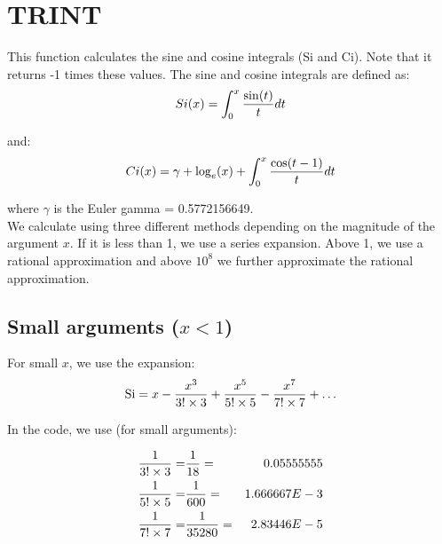 \section{TRINT}
\label{sect:trint}

\noindent This function calculates the sine and cosine integrals (Si and
Ci). Note that it returns -1 times these values. The sine and cosine
integrals are defined as:\\

\begin{equation}
Si(x) = \int_0^x {\sin(t) \over t} dt
\end{equation}

\noindent and:\\

\begin{equation}
Ci(x) = \gamma + \log_e(x) + \int_0^x {\cos(t-1) \over t} dt
\end{equation}

\noindent where $\gamma$ is the Euler gamma = 0.5772156649.\\

\noindent We calculate using three different methods depending on the
magnitude of the argument $x$. If it is less than 1, we use a series
expansion. Above 1, we use a rational approximation and above $10^8$ we
further approximate the rational approximation.\\

\subsection{Small arguments ($x < 1$)}

\noindent For small $x$, we use the expansion:\\

\begin{equation}
\mathrm{Si} = x - {x^3 \over 3! \times 3} + {x^5 \over 5! \times 5} -
{x^7 \over 7! \times 7} + {\ldots}
\end{equation}

\noindent In the code, we use (for small arguments):

\begin{eqnarray*}
{1 \over 3! \times 3} =& {1 \over 18}    =& 0.05555555\\
{1 \over 5! \times 5} =& {1 \over 600}   =& 1.666667E-3\\
{1 \over 7! \times 7} =& {1 \over 35280} =& 2.83446E-5
\end{eqnarray*}


